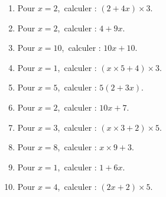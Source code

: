 \documentclass[11pt]{article}
\begin{document}
\begin{exercice}[1]
\begin{multicols}{2}
\begin{enumerate}[itemsep=1em]
\item Pour $x=2$,\, calculer : $\left(2+4 x\right)\times 3$.
\item Pour $x=2$,\, calculer : $4+9 x$.
\item Pour $x=10$,\, calculer : $10 x+10$.
\item Pour $x=1$,\, calculer : $\left( x\times 5+4\right)\times 3$.
\item Pour $x=5$,\, calculer : $5\left(2+3 x\right)$.
\item Pour $x=2$,\, calculer : $10 x+7$.
\item Pour $x=3$,\, calculer : $\left( x\times 3+2\right)\times 5$.
\item Pour $x=8$,\, calculer : $ x\times 9+3$.
\item Pour $x=1$,\, calculer : $1+6 x$.
\item Pour $x=4$,\, calculer : $\left(2 x+2\right)\times 5$.
\end{enumerate}
\end{multicols}
\end{exercice}
\end{document}
